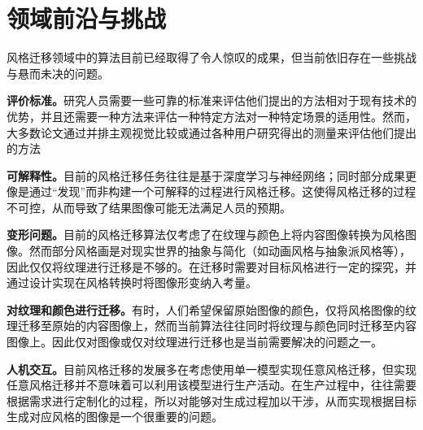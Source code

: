 \section{领域前沿与挑战}

风格迁移领域中的算法目前已经取得了令人惊叹的成果，但当前依旧存在一些挑战与悬而未决的问题。

\textbf{评价标准。}研究人员需要一些可靠的标准来评估他们提出的方法相对于现有技术的优势，并且还需要一种方法来评估一种特定方法对一种特定场景的适用性。然而，大多数论文通过并排主观视觉比较或通过各种用户研究得出的测量来评估他们提出的方法

\textbf{可解释性。}目前的风格迁移任务往往是基于深度学习与神经网络；同时部分成果更像是通过“发现”而非构建一个可解释的过程进行风格迁移\cite{ulyanovTextureNetworksFeedforward2016b}。这使得风格迁移的过程不可控，从而导致了结果图像可能无法满足人员的预期。

\textbf{变形问题。}目前的风格迁移算法仅考虑了在纹理与颜色上将内容图像转换为风格图像。然而部分风格画是对现实世界的抽象与简化（如动画风格与抽象派风格等），因此仅仅将纹理进行迁移是不够的。在迁移时需要对目标风格进行一定的探究，并通过设计实现在风格转换时将图像形变纳入考量。

\textbf{对纹理和颜色进行迁移。}有时，人们希望保留原始图像的颜色，仅将风格图像的纹理迁移至原始的内容图像上，然而当前算法往往同时将纹理与颜色同时迁移至内容图像上。因此仅对图像或仅对纹理进行迁移也是当前需要解决的问题之一。

\textbf{人机交互。}目前风格迁移的发展多在考虑使用单一模型实现任意风格迁移，但实现任意风格迁移并不意味着可以利用该模型进行生产活动。在生产过程中，往往需要根据需求进行定制化的过程，所以对能够对生成过程加以干涉，从而实现根据目标生成对应风格的图像是一个很重要的问题。